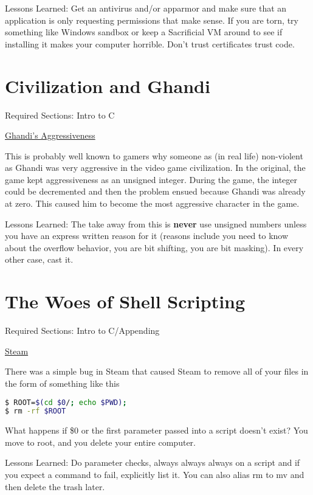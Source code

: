 Lessons Learned: Get an antivirus and/or apparmor and make sure that an application is only requesting permissions that make sense. If you are torn, try something like Windows sandbox or keep a Sacrificial VM around to see if installing it makes your computer horrible. Don't trust certificates trust code.

\section{Civilization and Ghandi}

Required Sections: Intro to C

\href{https://www.geek.com/games/why-gandhi-is-always-a-warmongering-jerk-in-civilization-1608515/}{Ghandi's Aggressiveness}

This is probably well known to gamers why someone as (in real life) non-violent as Ghandi was very aggressive in the video game civilization.
In the original, the game kept aggressiveness as an unsigned integer.
During the game, the integer could be decremented and then the problem ensued because Ghandi was already at zero.
This caused him to become the most aggressive character in the game.

Lessons Learned: The take away from this is \textbf{never} use unsigned numbers unless you have an express written reason for it (reasons include you need to know about the overflow behavior, you are bit shifting, you are bit masking).
In every other case, cast it.


\section{The Woes of Shell Scripting}

Required Sections: Intro to C/Appending

\href{https://www.pcworld.com/article/2871653/scary-steam-for-linux-bug-erases-all-the-personal-files-on-your-pc.html}{Steam}

There was a simple bug in Steam that caused Steam to remove all of your files in the form of something like this

\begin{lstlisting}[language=bash]
$ ROOT=$(cd $0/; echo $PWD);
$ rm -rf $ROOT
\end{lstlisting}

What happens if \$0 or the first parameter passed into a script doesn't exist? You move to root, and you delete your entire computer.

Lessons Learned: Do parameter checks, always always always  on a script and if you expect a command to fail, explicitly list it. You can also alias rm to mv and then delete the trash later.

